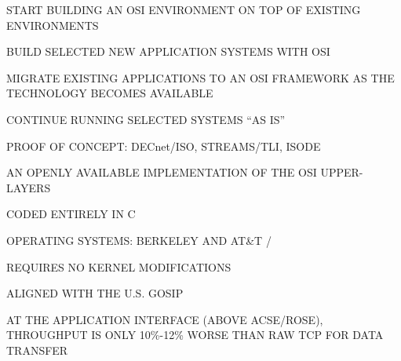 

\begin{bwslide}

\begin{nrtc}
\item	START BUILDING AN OSI ENVIRONMENT ON TOP OF EXISTING ENVIRONMENTS

\item	BUILD SELECTED NEW APPLICATION SYSTEMS WITH OSI

\item	MIGRATE EXISTING APPLICATIONS TO AN OSI FRAMEWORK AS THE TECHNOLOGY
	BECOMES AVAILABLE

\item	CONTINUE RUNNING SELECTED SYSTEMS ``AS IS''

\item	PROOF OF CONCEPT: DECnet/ISO, STREAMS/TLI, ISODE
\end{nrtc}
\end{bwslide}




\begin{bwslide}
\vskip-0.1in
\end{bwslide}


\begin{bwslide}

\begin{nrtc}
\item	AN OPENLY AVAILABLE IMPLEMENTATION OF THE OSI UPPER-LAYERS

\item	CODED ENTIRELY IN C

\item	OPERATING SYSTEMS: BERKELEY AND AT\&T \unix/
    \begin{nrtc}
    \item	REQUIRES NO KERNEL MODIFICATIONS
    \end{nrtc}

\item	ALIGNED WITH THE U.S. GOSIP

\item	AT THE APPLICATION INTERFACE (ABOVE ACSE/ROSE),
	THROUGHPUT IS ONLY 10\%-12\% WORSE THAN RAW TCP FOR DATA TRANSFER
\end{nrtc}
\end{bwslide}



